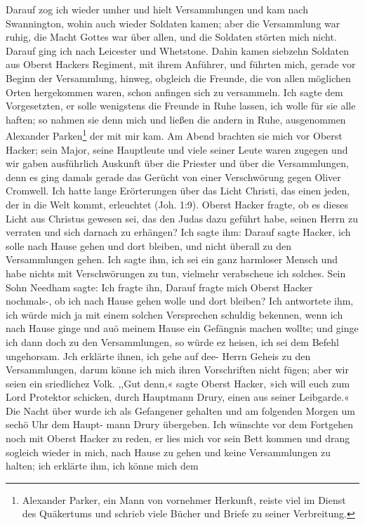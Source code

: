 Darauf zog ich wieder umher und hielt Versammlungen und
kam nach Swannington, wohin auch wieder Soldaten kamen;
aber die Versammlung war ruhig, die Macht Gottes war
über allen, und die Soldaten störten mich nicht. Darauf ging
ich nach Leicester und Whetstone. Dahin kamen siebzehn Soldaten
aus Oberst Hackers Regiment, mit ihrem Anführer, und führten
mich, gerade vor Beginn der Versammlung, hinweg, obgleich die
Freunde, die von allen möglichen Orten hergekommen waren,
schon anfingen sich zu versammeln. Ich sagte dem Vorgesetzten,
er solle wenigstens die Freunde in Ruhe lassen, ich wolle für sie
alle haften; so nahmen sie denn mich und ließen die andern in
Ruhe, ausgenommen Alexander 
Parken\footnote{Alexander Parker, 
ein Mann von vornehmer Herkunft, reiste viel im
Dienst des Quäkertums und schrieb viele Bücher und Briefe 
zu seiner Verbreitung.} der mit mir kam. Am
Abend brachten sie mich vor Oberst Hacker; sein Major, seine
Hauptleute und viele seiner Leute waren zugegen und wir gaben
ausführlich Auskunft über die Priester und über die Versammlungen,
denn es ging damals gerade das Gerücht von einer Verschwörung
gegen Oliver Cromwell. Ich hatte lange Erörterungen über das
Licht Christi, das einen jeden, der in die Welt kommt, erleuchtet
(Joh. 1:9). Oberst Hacker fragte, 
ob es dieses Licht aus Christus
gewesen sei, das den Judas dazu geführt habe, seinen Herrn zu
verraten und sich darnach zu erhängen? Ich sagte ihm:  Darauf sagte Hacker, ich solle nach Hause gehen und dort
bleiben, und nicht überall zu den Versammlungen gehen. Ich sagte
ihm, ich sei ein ganz harmloser Mensch und habe nichts mit 
Verschwörungen zu tun, vielmehr verabscheue ich solches. Sein Sohn
Needham sagte:  Ich fragte
ihn,  Darauf fragte mich Oberst Hacker nochmals-, ob ich
nach Hause gehen wolle und dort bleiben? Ich antwortete ihm,
ich würde mich ja mit einem solchen Versprechen schuldig bekennen,
wenn ich nach Hause ginge und auö meinem Hause ein Gefängnis
machen wollte; und ginge ich dann doch zu den Versammlungen, so
würde ez heisen, ich sei dem Befehl ungehorsam. Jch erklärte
ihnen, ich gehe auf dee- Herrn Geheis zu den Versammlungen,
darum könne ich mich ihren Vorschriften nicht fügen; aber wir
seien ein sriedlichez Volk. ,,Gut denn,« sagte Oberst Hacker, »ich will
euch zum Lord Protektor schicken, durch Hauptmann Drury, einen
aus seiner Leibgarde.« Die Nacht über wurde ich als Gefangener
gehalten und am folgenden Morgen um sechö Uhr dem Haupt-
mann Drury übergeben. Ich wünschte vor dem Fortgehen noch
mit Oberst Hacker zu reden, er lies mich vor sein Bett kommen und
drang sogleich wieder in mich, nach Hause zu gehen und keine
Versammlungen zu halten; ich erklärte ihm, ich könne mich dem



